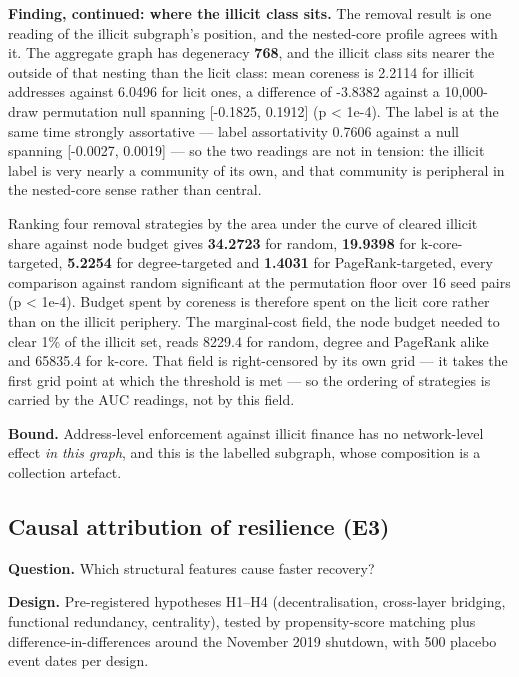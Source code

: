 \textbf{Finding, continued: where the illicit class sits.} The removal result is
one reading of the illicit subgraph's position, and the nested-core profile
agrees with it. The aggregate graph has degeneracy \textbf{768}, and the illicit
class sits nearer the outside of that nesting than the licit class: mean coreness
is 2.2114 for illicit addresses against 6.0496 for licit ones, a difference of
-3.8382 against a 10,000-draw permutation null spanning [-0.1825, 0.1912] (p
\textless{} 1e-4). The label is at the same time strongly assortative --- label
assortativity 0.7606 against a null spanning [-0.0027, 0.0019] --- so the two
readings are not in tension: the illicit label is very nearly a community of its
own, and that community is peripheral in the nested-core sense rather than
central.

Ranking four removal strategies by the area under the curve of cleared illicit
share against node budget gives \textbf{34.2723} for random, \textbf{19.9398} for
k-core-targeted, \textbf{5.2254} for degree-targeted and \textbf{1.4031} for
PageRank-targeted, every comparison against random significant at the permutation
floor over 16 seed pairs (p \textless{} 1e-4). Budget spent by coreness is
therefore spent on the licit core rather than on the illicit periphery. The
marginal-cost field, the node budget needed to clear 1\% of the illicit set,
reads 8229.4 for random, degree and PageRank alike and 65835.4 for k-core. That
field is right-censored by its own grid --- it takes the first grid point at
which the threshold is met --- so the ordering of strategies is carried by the
AUC readings, not by this field.

\textbf{Bound.} Address-level enforcement against illicit finance has no
network-level effect \emph{in this graph}, and this is the labelled subgraph,
whose composition is a collection artefact.

\subsection{Causal attribution of resilience (E3)}

\textbf{Question.} Which structural features cause faster recovery?

\textbf{Design.} Pre-registered hypotheses H1--H4 (decentralisation, cross-layer
bridging, functional redundancy, centrality), tested by propensity-score
matching plus difference-in-differences around the November 2019 shutdown, with
500 placebo event dates per design.

